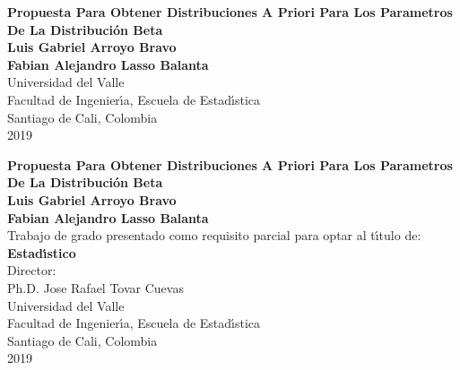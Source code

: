 
\begin{center}
\begin{figure}
\centering
{}
\end{figure}

\thispagestyle{empty}
\vspace*{2.0cm}

\textbf{\huge Propuesta Para Obtener Distribuciones A Priori Para Los Parametros De La Distribuci\'{o}n Beta}\\[5.0cm]

\Large\textbf{Luis Gabriel Arroyo Bravo}\\
\Large\textbf{Fabian Alejandro Lasso Balanta}\\[4.0cm]
\small Universidad del Valle\\
Facultad de Ingenier\'{\i}a, Escuela de Estad\'{\i}stica\\
Santiago de Cali, Colombia\\
2019\\
\end{center}

\newpage{\pagestyle{empty}\cleardoublepage}

\newpage

\begin{center}
\thispagestyle{empty}
\vspace*{0cm}

\textbf{\huge Propuesta Para Obtener Distribuciones A Priori Para Los Parametros De La Distribuci\'{o}n Beta}\\[3.5cm]

\Large\textbf{Luis Gabriel Arroyo Bravo}\\
\Large\textbf{Fabian Alejandro Lasso Balanta}\\[3.0cm]
\small Trabajo de grado presentado como requisito parcial para optar al t\'{\i}tulo de:\\
\textbf{Estad\'{\i}stico}\\[2.5cm]
Director:\\
Ph.D. Jose Rafael Tovar Cuevas\\[4.0cm]
Universidad del Valle\\
Facultad de Ingenier\'{\i}a, Escuela de Estad\'{\i}stica\\
Santiago de Cali, Colombia\\
2019\\
\end{center}

